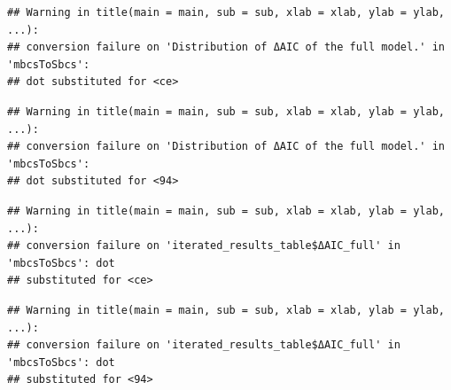 \documentclass[
]{article}
\newenvironment{Shaded}{\begin{snugshade}}{\end{snugshade}}
\newcommand{\AttributeTok}[1]{\textcolor[rgb]{0.77,0.63,0.00}{#1}}
\newcommand{\CommentTok}[1]{\textcolor[rgb]{0.56,0.35,0.01}{\textit{#1}}}
\newcommand{\FunctionTok}[1]{\textcolor[rgb]{0.00,0.00,0.00}{#1}}
\newcommand{\NormalTok}[1]{#1}
\newcommand{\OtherTok}[1]{\textcolor[rgb]{0.56,0.35,0.01}{#1}}
\newcommand{\SpecialCharTok}[1]{\textcolor[rgb]{0.00,0.00,0.00}{#1}}
\newcommand{\StringTok}[1]{\textcolor[rgb]{0.31,0.60,0.02}{#1}}
\begin{document}
\begin{Shaded}
\end{Shaded}

\begin{Shaded}
\end{Shaded}

\begin{verbatim}
## Warning in title(main = main, sub = sub, xlab = xlab, ylab = ylab, ...):
## conversion failure on 'Distribution of ΔAIC of the full model.' in 'mbcsToSbcs':
## dot substituted for <ce>
\end{verbatim}

\begin{verbatim}
## Warning in title(main = main, sub = sub, xlab = xlab, ylab = ylab, ...):
## conversion failure on 'Distribution of ΔAIC of the full model.' in 'mbcsToSbcs':
## dot substituted for <94>
\end{verbatim}

\begin{verbatim}
## Warning in title(main = main, sub = sub, xlab = xlab, ylab = ylab, ...):
## conversion failure on 'iterated_results_table$ΔAIC_full' in 'mbcsToSbcs': dot
## substituted for <ce>
\end{verbatim}

\begin{verbatim}
## Warning in title(main = main, sub = sub, xlab = xlab, ylab = ylab, ...):
## conversion failure on 'iterated_results_table$ΔAIC_full' in 'mbcsToSbcs': dot
## substituted for <94>
\end{verbatim}
\end{document}
